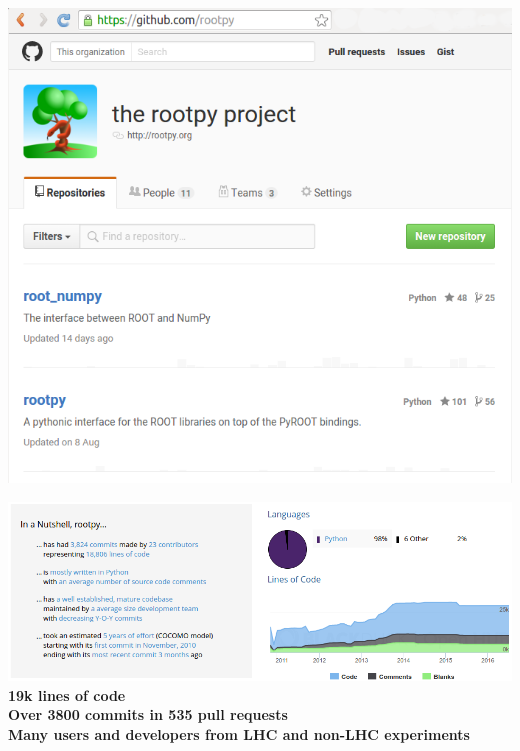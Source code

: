 \documentclass[10pt,professionalfonts,serif,usenames,dvipsnames,svgnames,table]{beamer}
\begin{document}
{

\begin{frame}[plain]
    \begin{center}
    \includegraphics[height=\textheight]{figs/rootpy-github.png}
    \end{center}
\end{frame}

\begin{frame}[plain]
    \begin{center}
    \includegraphics[width=\textwidth]{figs/rootpy-stats.png}\\
    
    \vspace{1cm}
    {\bf
    19k lines of code\\
    Over 3800 commits in 535 pull requests\\
    Many users and developers from LHC and non-LHC experiments}
    \end{center}
\end{frame}
}
\end{document}
